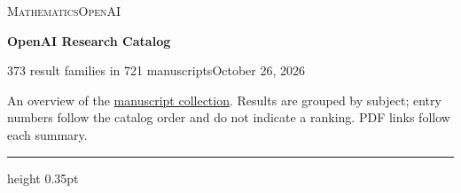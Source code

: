 \documentclass[11pt,a4paper]{article}
\begin{document}
\thispagestyle{firstpage}
{\small\scshape Mathematics\hfill OpenAI\par}
\vspace{5pt}
{\LARGE\bfseries OpenAI Research Catalog\par}
\vspace{4pt}
{\small 373 result families in 721 manuscripts\hfill October 26, 2026\par}
\vspace{7pt}
{\small An overview of the \href{https://github.com/openai/math}{manuscript collection}. Results are grouped by subject; entry numbers follow the catalog order and do not indicate a ranking. PDF links follow each summary.\par}
\vspace{8pt}\hrule height 0.35pt\vspace{5pt}
\end{document}
